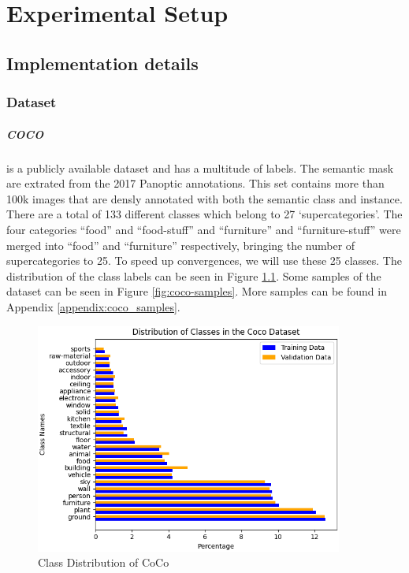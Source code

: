 \chapter{Experimental Setup}\label{chapter:second_real_chapter}

\section{Implementation details}
\subsection{Dataset}
\paragraph{COCO~\cite{lin2015microsoftcococommonobjects}} is a publicly available dataset and has a multitude of labels. The semantic mask are extrated from the 2017 Panoptic annotations. This set contains more than 100k images that are densly annotated with both the semantic class and instance. There are a total of 133 different classes which belong to 27 `supercategories'. The four categories ``food'' and ``food-stuff'' and ``furniture'' and ``furniture-stuff'' were merged into ``food'' and ``furniture'' respectively, bringing the number of supercategories to 25. To speed up convergences, we will use these 25 classes. The distribution of the class labels can be seen in Figure \ref{fig:coco-class-distribution}. Some samples of the dataset can be seen in Figure \ref{fig:coco-samples}. More samples can be found in Appendix \ref{appendix:coco_samples}. 


\begin{figure}[h]
    \centering
    \includegraphics[width=0.9\textwidth]{figures/datasets/coco/class_distribution.png}
    \caption{Class Distribution of CoCo}
    \label{fig:coco-class-distribution}
\end{figure}

